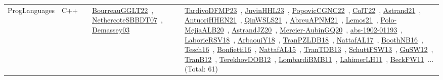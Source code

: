 {\begin{longtable}{lp{3cm}>{\raggedright\arraybackslash}p{6cm}>{\raggedright\arraybackslash}p{6cm}>{\raggedright\arraybackslash}p{8cm}}
ProgLanguages & C++ &  & \href{works/BourreauGGLT22.pdf}{BourreauGGLT22}~\cite{BourreauGGLT22}, \href{works/NethercoteSBBDT07.pdf}{NethercoteSBBDT07}~\cite{NethercoteSBBDT07}, \href{works/Demassey03.pdf}{Demassey03}~\cite{Demassey03} & \href{works/TardivoDFMP23.pdf}{TardivoDFMP23}~\cite{TardivoDFMP23}, \href{works/JuvinHHL23.pdf}{JuvinHHL23}~\cite{JuvinHHL23}, \href{works/PopovicCGNC22.pdf}{PopovicCGNC22}~\cite{PopovicCGNC22}, \href{works/ColT22.pdf}{ColT22}~\cite{ColT22}, \href{works/Astrand21.pdf}{Astrand21}~\cite{Astrand21}, \href{works/AntuoriHHEN21.pdf}{AntuoriHHEN21}~\cite{AntuoriHHEN21}, \href{works/QinWSLS21.pdf}{QinWSLS21}~\cite{QinWSLS21}, \href{works/AbreuAPNM21.pdf}{AbreuAPNM21}~\cite{AbreuAPNM21}, \href{works/Lemos21.pdf}{Lemos21}~\cite{Lemos21}, \href{works/Polo-MejiaALB20.pdf}{Polo-MejiaALB20}~\cite{Polo-MejiaALB20}, \href{works/AstrandJZ20.pdf}{AstrandJZ20}~\cite{AstrandJZ20}, \href{works/Mercier-AubinGQ20.pdf}{Mercier-AubinGQ20}~\cite{Mercier-AubinGQ20}, \href{works/abs-1902-01193.pdf}{abs-1902-01193}~\cite{abs-1902-01193}, \href{works/LaborieRSV18.pdf}{LaborieRSV18}~\cite{LaborieRSV18}, \href{works/ArbaouiY18.pdf}{ArbaouiY18}~\cite{ArbaouiY18}, \href{works/TranPZLDB18.pdf}{TranPZLDB18}~\cite{TranPZLDB18}, \href{works/NattafAL17.pdf}{NattafAL17}~\cite{NattafAL17}, \href{works/BoothNB16.pdf}{BoothNB16}~\cite{BoothNB16}, \href{works/Tesch16.pdf}{Tesch16}~\cite{Tesch16}, \href{works/Bonfietti16.pdf}{Bonfietti16}~\cite{Bonfietti16}, \href{works/NattafAL15.pdf}{NattafAL15}~\cite{NattafAL15}, \href{works/TranTDB13.pdf}{TranTDB13}~\cite{TranTDB13}, \href{works/SchuttFSW13.pdf}{SchuttFSW13}~\cite{SchuttFSW13}, \href{works/GuSW12.pdf}{GuSW12}~\cite{GuSW12}, \href{works/TranB12.pdf}{TranB12}~\cite{TranB12}, \href{works/TerekhovDOB12.pdf}{TerekhovDOB12}~\cite{TerekhovDOB12}, \href{works/LombardiBMB11.pdf}{LombardiBMB11}~\cite{LombardiBMB11}, \href{works/LahimerLH11.pdf}{LahimerLH11}~\cite{LahimerLH11}, \href{works/BeckFW11.pdf}{BeckFW11}~\cite{BeckFW11}... (Total: 61)\\

\end{longtable}}

